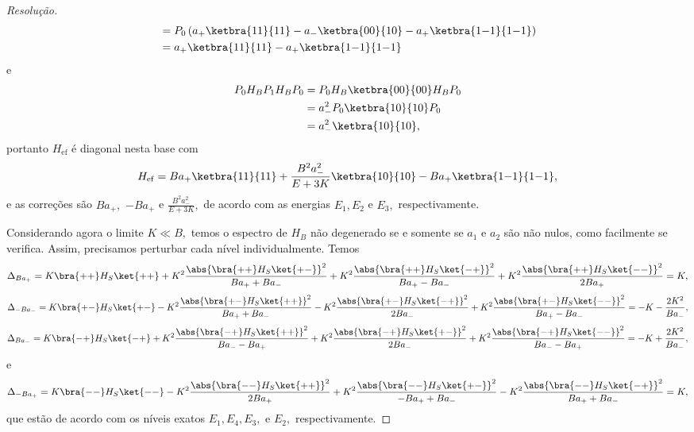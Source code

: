 \begin{proof}[Resolução]
\begin{align*}
                  &= P_0  \left(a_+ \ketbra{11}{11} - a_-\ketbra{00}{10}  -a_+\ketbra{1{-1}}{1{-1}}\right)\\
                  &= a_+ \ketbra{11}{11} - a_+ \ketbra{1{-1}}{1{-1}}
   \end{align*}
   e
   \begin{align*}
      P_0 H_B P_1 H_B P_0 &= P_0 H_B \ketbra{00}{00} H_B P_0\\
                          &= a_-^2 P_0 \ketbra{10}{10} P_0\\
                          &= a_-^2 \ketbra{10}{10},
   \end{align*}
   portanto \(H_{\mathrm{ef}}\) é diagonal nesta base com
   \begin{equation*}
      H_{\mathrm{ef}} = B a_+ \ketbra{11}{11} + \frac{B^2a_-^2}{E + 3K} \ketbra{10}{10} - B a_+ \ketbra{1{-1}}{1{-1}},
   \end{equation*}
   e as correções são \(Ba_+,\) \(- Ba_+\) e \(\frac{B^2 a_-^2}{E + 3K},\) de acordo com as energias \(E_1, E_2\) e \(E_3,\) respectivamente.

   Considerando agora o limite \(K \ll B,\) temos o espectro de \(H_B\) não degenerado se e somente se \(a_1\) e \(a_2\) são não nulos, como facilmente se verifica. Assim, precisamos perturbar cada nível individualmente. Temos
   \begin{equation*}
      \Delta_{B a_+} = K\bra{++}H_S\ket{++} + K^2\frac{\abs{\bra{++}H_S\ket{+-}}^2}{Ba_+ + Ba_-} + K^2\frac{\abs{\bra{++}H_S\ket{-+}}^2}{Ba_+ - Ba_-} + K^2\frac{\abs{\bra{++}H_S\ket{--}}^2}{2Ba_+}= K,
   \end{equation*}
   \begin{equation*}
      \Delta_{-B a_-} = K\bra{+-}H_S\ket{+-} - K^2\frac{\abs{\bra{+-}H_S\ket{++}}^2}{Ba_+ + Ba_-} - K^2\frac{\abs{\bra{+-}H_S\ket{-+}}^2}{2Ba_-} + K^2\frac{\abs{\bra{+-}H_S\ket{--}}^2}{Ba_+ - Ba_-}= -K - \frac{2K^2}{Ba_-},
   \end{equation*}
   \begin{equation*}
      \Delta_{B a_-} = K\bra{-+}H_S\ket{-+} + K^2\frac{\abs{\bra{-+}H_S\ket{++}}^2}{Ba_- - Ba_+} + K^2\frac{\abs{\bra{-+}H_S\ket{+-}}^2}{2Ba_-} + K^2\frac{\abs{\bra{-+}H_S\ket{--}}^2}{Ba_- - Ba_+}= -K + \frac{2K^2}{Ba_-},
   \end{equation*}
   e
   \begin{equation*}
      \Delta_{-B a_+} = K\bra{--}H_S\ket{--} - K^2\frac{\abs{\bra{--}H_S\ket{++}}^2}{2Ba_+} + K^2\frac{\abs{\bra{--}H_S\ket{+-}}^2}{-Ba_+ + Ba_-} - K^2\frac{\abs{\bra{--}H_S\ket{-+}}^2}{Ba_+ + Ba_-} = K,
   \end{equation*}
   que estão de acordo com os níveis exatos \(E_1, E_4, E_3,\) e \(E_2,\) respectivamente.
\end{proof}
